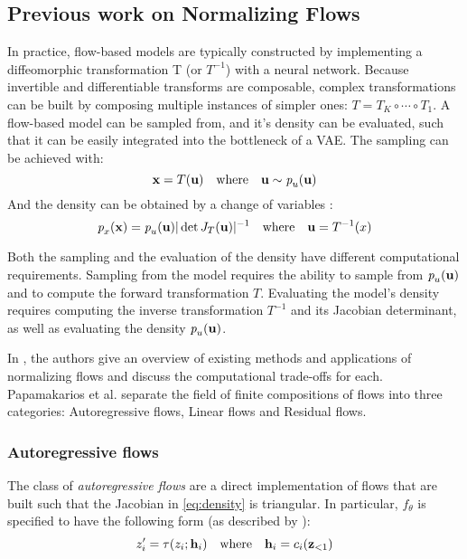 \documentclass[english]{scrartcl}
\begin{document}
    \subsection{Previous work on Normalizing Flows}\label{subsec:prev_work_nf}
    In practice, flow-based models are typically constructed by implementing a diffeomorphic transformation T (or $T^{-1}$) with a neural network.
    Because invertible and differentiable transforms are composable, complex transformations can be built by composing multiple instances of simpler ones: $T=T_K \circ \cdots \circ T_1$.
    A flow-based model can be sampled from, and it's density can be evaluated, such that it can be easily integrated into the bottleneck of a VAE.
    The sampling can be achieved with:
    \begin{equation}
        \textbf{x} = T(\textbf{u}) \quad \text{where} \quad \textbf{u} \sim \textit{p}_u (\textbf{u})
    \end{equation}
    And the density can be obtained by a change of variables \parencite{bogachev2007measure}:
    \begin{equation}
        \label{eq:density}
        \textit{p}_x (\textbf{x}) = \textit{p}_u (\textbf{u}) |\det J_T(\textbf{u})|^{-1} \quad \text{where} \quad \textbf{u} = T^{-1}(x)
    \end{equation}

    Both the sampling and the evaluation of the density have different computational requirements.
    Sampling from the model requires the ability to sample from $\textit{p}_u (\textbf{u})$ and to compute the forward transformation $T$.
    Evaluating the model's density requires computing the inverse transformation $T^{-1}$ and its Jacobian determinant, as well as evaluating the density $\textit{p}_u (\textbf{u})$.

    In \cite{papamakarios_normalizing_2019}, the authors give an overview of existing methods and applications of normalizing flows and discuss the computational trade-offs for each.
    Papamakarios et al. separate the field of finite compositions of flows into three categories: Autoregressive flows, Linear flows and Residual flows.

    \subsubsection{Autoregressive flows}
    The class of \textit{autoregressive flows} are a direct implementation of flows that are built such that the Jacobian in \cref{eq:density} is triangular.
    In particular, $f_{\theta}$ is specified to have the following form (as described by \cite{papamakarios_normalizing_2019}):
    \begin{equation}
        z_i^{\prime} = \tau(z_i;\textbf{h}_i) \quad \text{where} \quad \textbf{h}_i = c_i(\textbf{z}_{<1})
    \end{equation}
\end{document}
